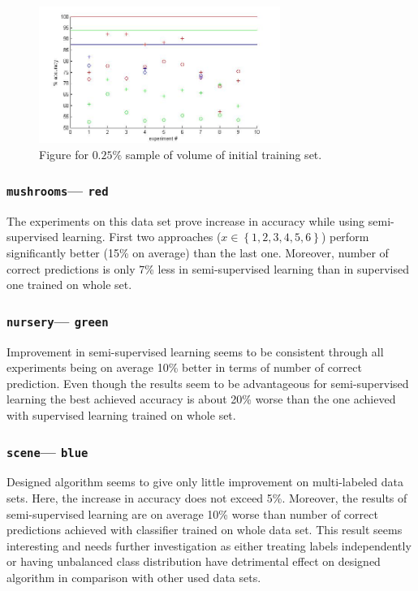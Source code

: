 \documentclass[12pt, a4paper, pdflatex]{report}
\begin{document}
\begin{figure}[htbp]
\centering
  \includegraphics[width=0.7\textwidth]{graphics/figures/Pfig3.jpg}
\begin{tiny}
\caption{\small Figure for $0.25\%$ sample of volume of initial training set.\label{img:025pc}}
\end{tiny}
\end{figure}

\subsubsection{\texttt{mushrooms}--- \texttt{red}}
The experiments on this data set prove increase in accuracy while using semi-supervised learning. First two approaches ($x \in \left \{ 1, 2, 3 ,4, 5, 6 \right \}$) perform significantly better (15\% on average) than the last one. Moreover, number of correct predictions is only 7\% less in semi-supervised learning than in supervised one trained on whole set.

\subsubsection{\texttt{nursery}--- \texttt{green}}
Improvement in semi-supervised learning seems to be consistent through all experiments being on average 10\% better in terms of number of correct prediction. Even though the results seem to be advantageous for semi-supervised learning the best achieved accuracy is about 20\% worse than the one achieved with supervised learning trained on whole set.

\subsubsection{\texttt{scene}--- \texttt{blue}}
Designed algorithm seems to give only little improvement on multi-labeled data sets. Here, the increase in accuracy does not exceed 5\%. Moreover, the results of semi-supervised learning are on average 10\% worse than number of correct predictions achieved with classifier trained on whole data set. This result seems interesting and needs further investigation as either treating labels independently or having unbalanced class distribution have detrimental effect on designed algorithm in comparison with other used data sets.
\end{document}
